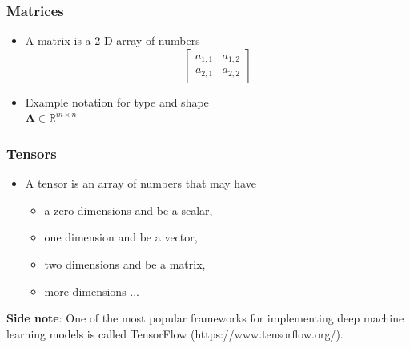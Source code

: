 \documentclass[notes]{beamer}          %
\newcommand{\vect}[1]{\bm{#1}}
\newcommand{\field}[1]{\mathbb{#1}}
\newcommand{\R}{\field{R}}
\newif\iffull
\begin{document}
\iffull
\begin{frame}
\frametitle{Vectors}
\begin{itemize}
    \item A vector is a 1-D array of numbers (integer, real, rational, ...)
    $
    \vect{x} = \begin{bmatrix} x_1 \\ x_2 \\ \ldots \\ x_n \end{bmatrix}
    $
    \item{Example notation for type and size} \\
    $\vect{x} \in \R^n$
 \end{itemize}
\end{frame}
\fi

\begin{frame}
\frametitle{Matrices}
\begin{itemize}
    \item A matrix is a 2-D array of numbers \\
    $$
    \begin{bmatrix}
    a_{1,1} & a_{1,2} \\
    a_{2,1} & a_{2,2}
    \end{bmatrix}
    $$
    \item Example notation for type and shape \\
    $\mathbf{A} \in \R^{m \times n}$
\end{itemize}
\end{frame}

\begin{frame}
\frametitle{Tensors}
\begin{itemize}
    \item A tensor is an array of numbers that may have
    \begin{itemize}
        \item a zero dimensions and be a scalar,
        \item one dimension and be a vector,
        \item two dimensions and be a matrix,
        \item more dimensions ...
    \end{itemize}
\end{itemize}

{\bf Side note}: One of the most popular frameworks for implementing deep machine learning models is called TensorFlow (https://www.tensorflow.org/).

\end{frame}
\end{document}
